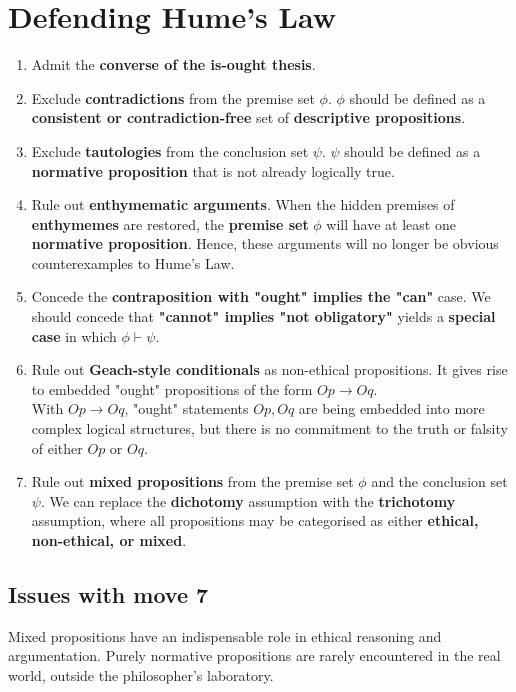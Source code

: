 \documentclass[11pt]{article}
\begin{document}
\section{Defending Hume's Law}
\label{sec:orga268035}
\begin{enumerate}
\item Admit the \textbf{converse of the is-ought thesis}.
\item Exclude \textbf{contradictions} from the premise set \(\phi\). \(\phi\) should be defined as a \textbf{consistent or contradiction-free} set of \textbf{descriptive propositions}.
\item Exclude \textbf{tautologies} from the conclusion set \(\psi\). \(\psi\) should be defined as a \textbf{normative proposition} that is not already logically true.
\item Rule out \textbf{enthymematic arguments}. When the hidden premises of \textbf{enthymemes} are restored, the \textbf{premise set} \(\phi\) will have at least one \textbf{normative proposition}. Hence, these arguments will no longer be obvious counterexamples to Hume's Law.
\item Concede the \textbf{contraposition with "ought" implies the "can"} case. We should concede that \textbf{"cannot" implies "not obligatory"} yields a \textbf{special case} in which \(\phi \vdash \psi\).
\item Rule out \textbf{Geach-style conditionals} as non-ethical propositions. It gives rise to embedded "ought" propositions of the form \(Op \rightarrow Oq\).  \\

With \(Op \rightarrow Oq\), "ought" statements \(Op, Oq\) are being embedded into more complex logical structures, but there is no commitment to the truth or falsity of either \(Op\) or \(Oq\).
\item Rule out \textbf{mixed propositions} from the premise set \(\phi\) and the conclusion set \(\psi\). We can replace the \textbf{dichotomy} assumption with the \textbf{trichotomy} assumption, where all propositions may be categorised as either \textbf{ethical, non-ethical, or mixed}.
\end{enumerate}

 \newpage
\subsection{Issues with move 7}
\label{sec:org489c6c2}
Mixed propositions have an indispensable role in ethical reasoning and argumentation. Purely normative propositions are rarely encountered in the real world, outside the philosopher's laboratory.  \\
\end{document}
